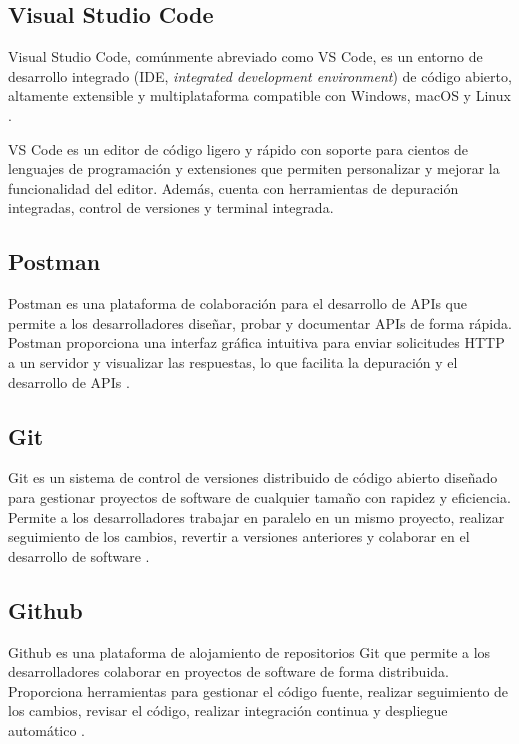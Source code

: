 \subsection{Visual Studio Code}

Visual Studio Code, comúnmente abreviado como VS Code, es un entorno de
desarrollo integrado (IDE, \textit{integrated development environment}) de
código abierto, altamente extensible y multiplataforma compatible con Windows,
macOS y Linux \cite{VSCode}.

VS Code es un editor de código ligero y rápido con soporte para cientos de
lenguajes de programación y extensiones que permiten personalizar y mejorar la
funcionalidad del editor. Además, cuenta con herramientas de depuración
integradas, control de versiones y terminal integrada.

\subsection{Postman}

Postman es una plataforma de colaboración para el desarrollo de APIs que
permite a los desarrolladores diseñar, probar y documentar APIs de forma
rápida. Postman proporciona una interfaz gráfica intuitiva para enviar
solicitudes HTTP a un servidor y visualizar las respuestas, lo que facilita la
depuración y el desarrollo de APIs \cite{Postman}.

\subsection{Git}

Git es un sistema de control de versiones distribuido de código abierto
diseñado para gestionar proyectos de software de cualquier tamaño con rapidez y
eficiencia. Permite a los desarrolladores trabajar en paralelo en un mismo
proyecto, realizar seguimiento de los cambios, revertir a versiones anteriores
y colaborar en el desarrollo de software \cite{Git}.

\subsection{Github}

Github es una plataforma de alojamiento de repositorios Git que permite a los
desarrolladores colaborar en proyectos de software de forma distribuida.
Proporciona herramientas para gestionar el código fuente, realizar seguimiento
de los cambios, revisar el código, realizar integración continua y despliegue
automático \cite{Github}.

